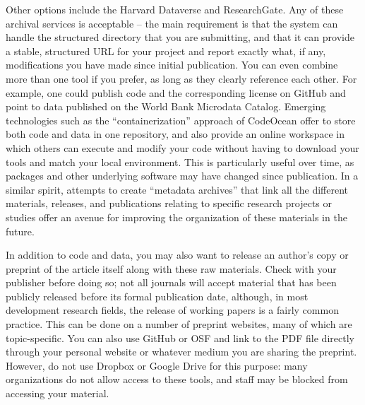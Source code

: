 Other options include the Harvard Dataverse
and ResearchGate.
Any of these archival services is acceptable --
the main requirement is that the system can handle
the structured directory that you are submitting,
and that it can provide a stable, structured URL for your project
and report exactly what, if any,
modifications you have made since initial publication.
You can even combine more than one tool if you prefer,
as long as they clearly reference each other.
For example, one could publish code and the corresponding license on GitHub
and point to data published on the World Bank Microdata Catalog.
Emerging technologies such as the ``containerization'' approach of CodeOcean
offer to store both code and data in one repository,
and also provide an online workspace in which others can execute and modify your code
without having to download your tools and match your local environment. 
This is particularly useful over time, as packages and other underlying software may have changed since publication.
In a similar spirit, attempts to create ``metadata archives''
that link all the different materials, releases, and publications
relating to specific research projects or studies
offer an avenue for improving the organization of these materials in the future.

In addition to code and data,
you may also want to release an author's copy or preprint
of the article itself along with these raw materials.
Check with your publisher before doing so;
not all journals will accept material that has been publicly released
before its formal publication date, although,
in most development research fields,
the release of working papers is a fairly common practice.
This can be done on a number of preprint websites,
many of which are topic-specific.
You can also use GitHub or OSF and link to the PDF file directly
through your personal website or whatever medium you are sharing the preprint.
However, do not use Dropbox or Google Drive for this purpose:
many organizations do not allow access to these tools,
and staff may be blocked from accessing your material.
